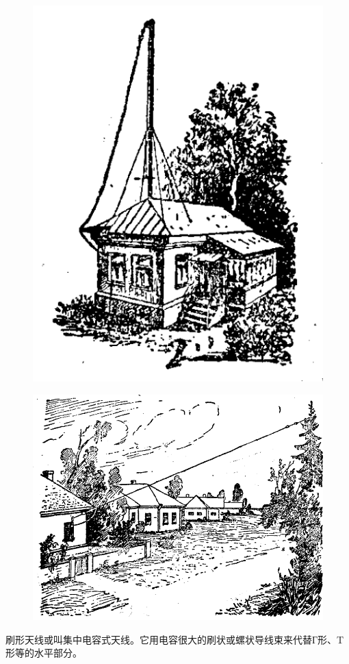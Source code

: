 \documentclass[12pt,UTF8]{ctexbook}
\begin{document}
\begin{figure}[htbp]
	\centering
	\includegraphics[width=0.7\linewidth]{4}
	\caption{}
	\label{fig:1}
\end{figure}

\begin{figure}[htbp]
	\centering
	\includegraphics[width=0.7\linewidth]{5}
	\caption{}
	\label{fig:1}
\end{figure}

刷形天线或叫集中电容式天线。它用电容很大的刷状或螺状导线束来代替Г形、T形等的水平部分。
\end{document}
